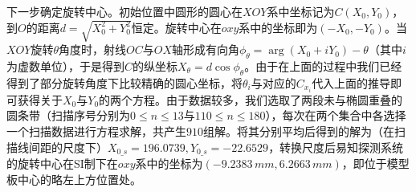 下一步确定旋转中心。初始位置中圆形的圆心在$XOY$系中坐标记为$C(X_0,Y_0)$，到$O$的距离$d=\sqrt{X_0^2+Y_0^2}$恒定。旋转中心在$oxy$系中的坐标即为$(-X_0,-Y_0)$。当$XOY$旋转$\theta$角度时，射线$OC$与$OX$轴形成有向角$\phi_\theta=\arg(X_0+iY_0)-\theta$（其中$i$为虚数单位），于是得到$C$的纵坐标$X_\theta=d\cos\phi_\theta$。由于在上面的过程中我们已经得到了部分旋转角度下比较精确的圆心坐标，将$\theta_i$与对应的$C_{x_i}$代入上面的推导即可获得关于$X_0$与$Y_0$的两个方程。由于数据较多，我们选取了两段未与椭圆重叠的圆条带（扫描序号分别为$0 \leq n \leq 13$与$110 \leq n \leq 180$），每次在两个集合中各选择一个扫描数据进行方程求解，共产生$910$组解。将其分别平均后得到的解为（在扫描线间距的尺度下）$X_{0\_s}= 196.0739, Y_{0\_s}= -22.6529$，转换尺度后易知探测系统的旋转中心在SI制下在$oxy$系中的坐标为$(-9.2383\,\si{mm}, 6.2663\,\si{mm})$，即位于模型板中心的略左上方位置处。